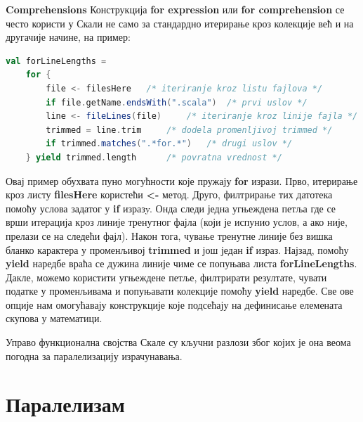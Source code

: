 \documentclass[12pt,oneside]{memoir}
\begin{document}
\begin{description}
\item \textbf{Comprehensions}
Конструкција \textbf{for expression} или \textbf{for comprehension} се често користи у Скали не само за стандардно итерирање кроз колекције већ и на другачије начине, на пример:
\begin{lstlisting}[language=Scala]
val forLineLengths =
	for {
		file <- filesHere 	/* iteriranje kroz listu fajlova */
		if file.getName.endsWith(".scala") 	/* prvi uslov */
		line <- fileLines(file) 	/* iteriranje kroz linije fajla */
		trimmed = line.trim 	/* dodela promenljivoj trimmed */
		if trimmed.matches(".*for.*") 	/* drugi uslov */
	} yield trimmed.length 		/* povratna vrednost */
\end{lstlisting}
Овај пример обухвата пуно могућности које пружају \textbf{for} изрази. Прво, итерирање кроз листу \textbf{filesHere} користећи \textbf{<-} метод. Друго, филтрирање тих датотека помоћу услова задатог у \textbf{if} изразy. Онда следи једна угњеждена петља где се врши итерација кроз линије тренутног фајла (који је испунио услов, а ако није, прелази се на следећи фајл). Након тога, чување тренутне линије без вишка бланко карактера у променљивој \textbf{trimmed} и још један \textbf{if} израз. Најзад, помоћу \textbf{yield} наредбе враћа се дужина линије чиме се попуњава листа \textbf{forLineLengths}. Дакле, можемо користити угњеждене петље, филтрирати резултате, чувати податке у променљивама и попуњавати колекције помоћу \textbf{yield} наредбе. Све ове опције нам омогућавају конструкције које подсећају на дефинисање елемената скупова у математици.
\end{description}

\par Управо функционална својства Скале су кључни разлози због којих је она веома погодна за паралелизацију израчунавања. 

\section{Паралелизам}
\label{sec:paralelizam}
\end{document}
